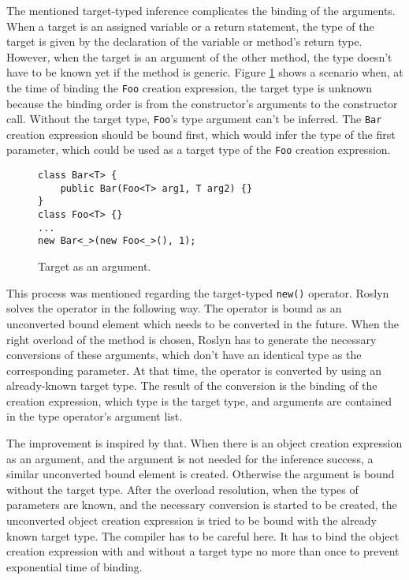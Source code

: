 The mentioned target-typed inference complicates the binding of the arguments. 
When a target is an assigned variable or a return statement, the type of the target is given by the declaration of the variable or method’s return type. 
However, when the target is an argument of the other method, the type doesn’t have to be known yet if the method is generic. 
Figure \ref{img60:target} shows a scenario when, at the time of binding the \texttt{Foo} creation expression, the target type is unknown because the binding order is from the constructor’s arguments to the constructor call. 
Without the target type, \texttt{Foo}'s type argument can’t be inferred. 
The \texttt{Bar} creation expression should be bound first, which would infer the type of the first parameter, which could be used as a target type of the \texttt{Foo} creation expression.
\begin{figure}[h!]
\begin{lstlisting}[style=csharp, mathescape=true]
class Bar<T> {
    public Bar(Foo<T> arg1, T arg2) {}
}
class Foo<T> {}
...
new Bar<_>(new Foo<_>(), 1);
\end{lstlisting}
\caption{Target as an argument.}
\label{img60:target}
\end{figure}
\par
This process was mentioned regarding the target-typed \texttt{new()} operator. 
Roslyn solves the operator in the following way. The operator is bound as an unconverted bound element which needs to be converted in the future. 
When the right overload of the method is chosen, Roslyn has to generate the necessary conversions of these arguments, which don't have an identical type as the corresponding parameter. 
At that time, the operator is converted by using an already-known target type. 
The result of the conversion is the binding of the creation expression, which type is the target type, and arguments are contained in the type operator’s argument list.
\par
The improvement is inspired by that. 
When there is an object creation expression as an argument, and the argument is not needed for the inference success, a similar unconverted bound element is created.
Otherwise the argument is bound without the target type.
After the overload resolution, when the types of parameters are known, and the necessary conversion is started to be created, the unconverted object creation expression is tried to be bound with the already known target type. 
The compiler has to be careful here. 
It has to bind the object creation expression with and without a target type no more than once to prevent exponential time of binding.
